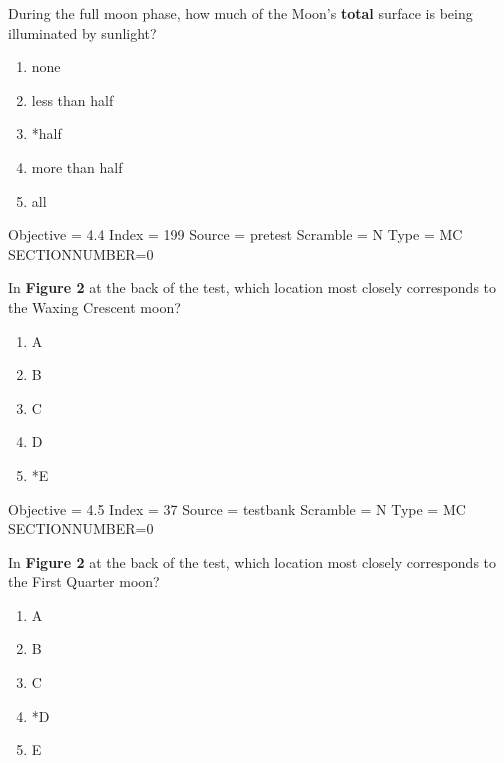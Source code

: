 \documentclass[11pt]{article}
\begin{document}
\begin{enumerate}
\begin{minipage}{\textwidth}
\begin{minipage}{\textwidth}
\item During the full moon phase, how much of the Moon’s {\bf total} surface is being illuminated by sunlight?
\begin{multicols}{3}
\begin{enumerate} 
\setlength{\itemsep}{1pt} 
\setlength{\parskip}{0pt} 
\setlength{\parsep}{0pt}
\setlength{\multicolsep}{1pt} 
\item none
\item less than half
\item *half
\item more than half
\item all
\end{enumerate} 
\vfill 
\end{multicols}

Objective = 4.4
Index = 199
Source = pretest
Scramble = N
Type = MC
SECTIONNUMBER=0
\end{minipage}
\end{minipage}
\vskip 0.20in

\begin{minipage}{\textwidth}
\begin{minipage}{\textwidth}
\item In {\bf Figure 2} at the back of the test, which location most closely corresponds to the Waxing Crescent moon?
\begin{multicols}{3}
\begin{enumerate} 
\setlength{\itemsep}{1pt} 
\setlength{\parskip}{0pt} 
\setlength{\parsep}{0pt}
\setlength{\multicolsep}{1pt} 
\item A
\item B
\item C
\item D
\item *E
\end{enumerate} 
\vfill 
\end{multicols}

Objective = 4.5
Index = 37
Source = testbank
Scramble = N
Type = MC
SECTIONNUMBER=0
\end{minipage}
\end{minipage}
\vskip 0.20in

\begin{minipage}{\textwidth}
\begin{minipage}{\textwidth}
\item In {\bf Figure 2} at the back of the test, which location most closely corresponds to the First Quarter moon?
\begin{multicols}{3}
\begin{enumerate} 
\setlength{\itemsep}{1pt} 
\setlength{\parskip}{0pt} 
\setlength{\parsep}{0pt}
\setlength{\multicolsep}{1pt} 
\item A
\item B
\item C
\item *D
\item E
\end{enumerate} 
\vfill 
\end{multicols}


\end{minipage}
\end{minipage}
\end{enumerate}
\end{document}
